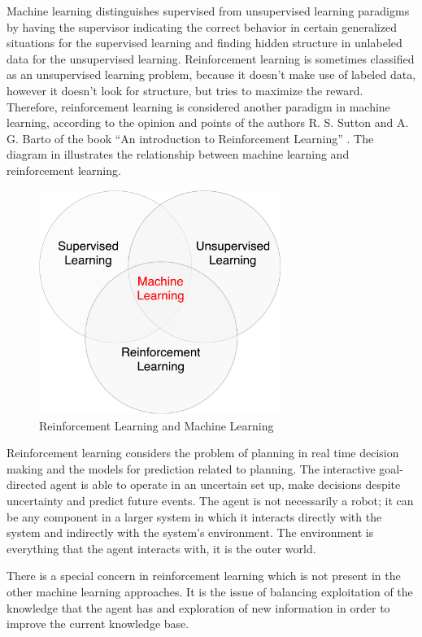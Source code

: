Machine learning distinguishes supervised from unsupervised learning paradigms by having the supervisor indicating the correct behavior in certain generalized situations for the supervised learning and finding hidden structure in unlabeled data for the unsupervised learning. Reinforcement learning is sometimes classified as an unsupervised learning problem, because it doesn’t make use of labeled data, however it doesn’t look for structure, but tries to maximize the reward. Therefore, reinforcement learning is considered another paradigm in machine learning, according to the opinion and points of the authors R. S. Sutton and A. G. Barto of the book “An introduction to Reinforcement Learning” \cite{Sutton}. The diagram in  illustrates the relationship between machine learning and reinforcement learning.
\begin{figure}[H]
	\centering
	\includegraphics[width=0.7\textwidth]{Figures/RLandML}
	\caption{Reinforcement Learning and Machine Learning}
	\label{fig:RLandML}
\end{figure}
Reinforcement learning considers the problem of planning in real time decision making and the models for prediction related to planning. The interactive goal-directed agent is able to operate in an uncertain set up, make decisions despite uncertainty and predict future events. The agent is not necessarily a robot; it can be any component in a larger system in which it interacts directly with the system and indirectly with the system’s environment. The environment is everything that the agent interacts with, it is the outer world.

There is a special concern in reinforcement learning which is not present in the other machine learning approaches. It is the issue of balancing exploitation of the knowledge that the agent has and exploration of new information in order to improve the current knowledge base.

